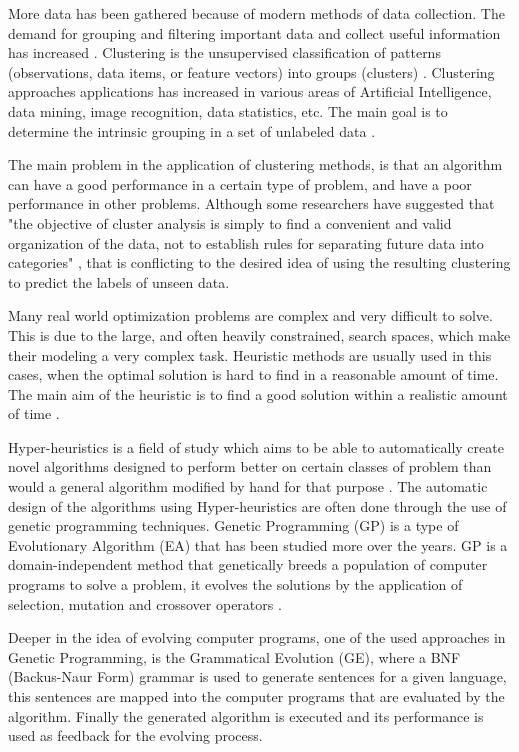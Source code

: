 \documentclass[journal]{IEEEtran}
\begin{document}
More data has been gathered because of modern methods of data collection. The demand for grouping and filtering important data and collect useful information has increased \cite{ahalya2015data}. Clustering is the unsupervised classification of patterns (observations, data items, or feature vectors) into groups (clusters) \cite{jain1988algorithms}. Clustering approaches applications has increased in various areas of Artificial Intelligence, data mining, image recognition, data statistics, etc. The main goal is to determine the intrinsic grouping in a set of unlabeled data \cite{ahalya2015data}.

The main problem in the application of clustering methods, is that an algorithm can have a good performance in a certain type of problem, and have a poor performance in other problems. Although some researchers have suggested that "the objective of cluster analysis is simply to find a convenient and valid organization of the data, not to establish rules for separating future data into categories" \cite{jain1988algorithms}, that is conflicting to the desired idea of using the resulting clustering to predict the labels of unseen data.

Many real world optimization problems are complex and very difficult to solve. This is due to the large, and often heavily constrained, search spaces, which make their modeling a very complex task. Heuristic methods are usually used in this cases, when the optimal solution is hard to find in a reasonable amount of time. The main aim of the heuristic is to find a good solution within a realistic amount of time \cite{sabar2013grammatical}.

Hyper-heuristics is a field of study which aims to be able to automatically create novel algorithms designed to perform better on certain classes of problem than would a general algorithm modified by hand for that purpose \cite{harris2015comparison}. The automatic design of the algorithms using Hyper-heuristics are often done through the use of genetic programming techniques. Genetic Programming (GP) is a type of Evolutionary Algorithm (EA) that has been studied more over the years. GP is a domain-independent method that genetically breeds a population of computer programs to solve a problem, it evolves the solutions by the application of selection, mutation and crossover operators \cite{poli2014genetic}.

Deeper in the idea of evolving computer programs, one of the used approaches in Genetic Programming, is the Grammatical Evolution (GE), where a BNF (Backus-Naur Form) grammar is used to generate sentences for a given language, this sentences are mapped into the computer programs that are evaluated by the algorithm. Finally the generated algorithm is executed and its performance is used as feedback for the evolving process.
\end{document}

